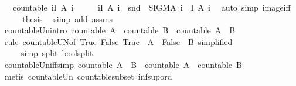 \begin{isabellebody}
\ \ \ {\isachardoublequoteopen}countable\ {\isacharparenleft}{\isasymUnion}i{\isasymin}I{\isachardot}\ A\ i{\isacharparenright}{\isachardoublequoteclose}\isanewline
%
\isadelimproof
%
\endisadelimproof
%
\isatagproof
{}\isamarkupfalse%
\ {\isacharminus}\isanewline
\ \ \isamarkupfalse%
\ {\isachardoublequoteopen}{\isacharparenleft}{\isasymUnion}i{\isasymin}I{\isachardot}\ A\ i{\isacharparenright}\ {\isacharequal}\ snd\ {\isacharbackquote}\ {\isacharparenleft}SIGMA\ i\ {\isacharcolon}\ I{\isachardot}\ A\ i{\isacharparenright}{\isachardoublequoteclose}\ \isamarkupfalse%
\ {\isacharparenleft}auto\ simp{\isacharcolon}\ image{\isacharunderscore}iff{\isacharparenright}\isanewline
\ \ \isamarkupfalse%
\ \isamarkupfalse%
\ {\isacharquery}thesis\ \isamarkupfalse%
\ {\isacharparenleft}simp\ add{\isacharcolon}\ assms{\isacharparenright}\isanewline
{}\isamarkupfalse%
%
\endisatagproof
{\isafoldproof}%
%
\isadelimproof
\isanewline
%
\endisadelimproof
\isanewline
{}\isamarkupfalse%
\ countable{\isacharunderscore}Un{\isacharbrackleft}intro{\isacharbrackright}{\isacharcolon}\ {\isachardoublequoteopen}countable\ A\ {\isasymLongrightarrow}\ countable\ B\ {\isasymLongrightarrow}\ countable\ {\isacharparenleft}A\ {\isasymunion}\ B{\isacharparenright}{\isachardoublequoteclose}\isanewline
%
\isadelimproof
\ \ %
\endisadelimproof
%
\isatagproof
{}\isamarkupfalse%
\ {\isacharparenleft}rule\ countable{\isacharunderscore}UN{\isacharbrackleft}of\ {\isachardoublequoteopen}{\isacharbraceleft}True{\isacharcomma}\ False{\isacharbraceright}{\isachardoublequoteclose}\ {\isachardoublequoteopen}{\isasymlambda}True\ {\isasymRightarrow}\ A\ {\isacharbar}\ False\ {\isasymRightarrow}\ B{\isachardoublequoteclose}{\isacharcomma}\ simplified{\isacharbrackright}{\isacharparenright}\isanewline
\ \ \ \ \ {\isacharparenleft}simp\ split{\isacharcolon}\ bool{\isachardot}split{\isacharparenright}%
\endisatagproof
{\isafoldproof}%
%
\isadelimproof
\isanewline
%
\endisadelimproof
\isanewline
{}\isamarkupfalse%
\ countable{\isacharunderscore}Un{\isacharunderscore}iff{\isacharbrackleft}simp{\isacharbrackright}{\isacharcolon}\ {\isachardoublequoteopen}countable\ {\isacharparenleft}A\ {\isasymunion}\ B{\isacharparenright}\ {\isasymlongleftrightarrow}\ countable\ A\ {\isasymand}\ countable\ B{\isachardoublequoteclose}\isanewline
%
\isadelimproof
\ \ %
\endisadelimproof
%
\isatagproof
{}\isamarkupfalse%
\ {\isacharparenleft}metis\ countable{\isacharunderscore}Un\ countable{\isacharunderscore}subset\ inf{\isacharunderscore}sup{\isacharunderscore}ord{\isacharparenleft}{}{\isacharcomma}{}{\isacharparenright}{\isacharparenright}%

\end{isabellebody}
